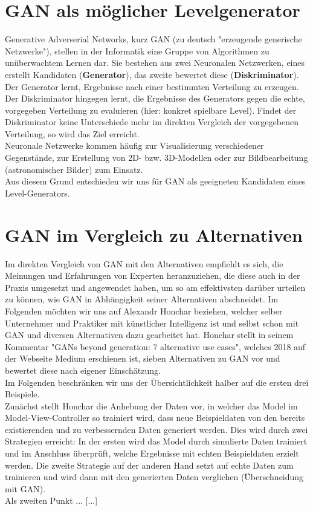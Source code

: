 \documentclass[11pt]{article}
\begin{document}
\section{GAN als möglicher Levelgenerator}
Generative Adverserial Networks, kurz GAN (zu deutsch "erzeugende generische Netzwerke"), stellen in der Informatik eine Gruppe von Algorithmen zu unüberwachtem Lernen dar. Sie bestehen aus zwei Neuronalen Netzwerken, eines erstellt Kandidaten (\textbf{Generator}), das zweite bewertet diese (\textbf{Diskriminator}).\\Der Generator lernt, Ergebnisse nach einer bestimmten Verteilung zu erzeugen. Der Diskriminator hingegen lernt, die Ergebnisse des Generators gegen die echte, vorgegeben Verteilung zu evaluieren (hier: konkret spielbare Level). Findet der Diskriminator keine Unterschiede mehr im direkten Vergleich der vorgegebenen Verteilung, so wird das Ziel erreicht.\\Neuronale Netzwerke kommen häufig zur Visualisierung verschiedener Gegenstände, zur Erstellung von 2D- bzw. 3D-Modellen oder zur Bildbearbeitung (astronomischer Bilder) zum Einsatz.\\Aus diesem Grund entschieden wir uns für GAN als geeigneten Kandidaten eines Level-Generators.
\section{GAN im Vergleich zu Alternativen}
Im direkten Vergleich von GAN mit den Alternativen empfiehlt es sich, die Meinungen und Erfahrungen von Experten heranzuziehen, die diese auch in der Praxis umgesetzt und angewendet haben, um so am effektivsten darüber urteilen zu können, wie GAN in Abhängigkeit seiner Alternativen abschneidet. Im Folgenden möchten wir uns auf Alexandr Honchar beziehen, welcher selber Unternehmer und Praktiker mit künstlicher Intelligenz ist und selbst schon mit GAN und diversen Alternativen dazu gearbeitet hat. Honchar stellt in seinem Kommentar "GANs beyond generation: 7 alternative use cases", welches 2018 auf der Webseite Medium erschienen ist, sieben Alternativen zu GAN vor und bewertet diese nach eigener Einschätzung.\\ Im Folgenden beschränken wir uns der Übersichtlichkeit halber auf die ersten drei Beispiele. \\Zunächst stellt Honchar die Anhebung der Daten vor, in welcher das Model im Model-View-Controller so trainiert wird, dass neue Beispieldaten von den bereits existierenden und zu verbessernden Daten generiert werden. Dies wird durch zwei Strategien erreicht: In der ersten wird das Model durch simulierte Daten trainiert und im Anschluss überprüft, welche Ergebnisse mit echten Beispieldaten erzielt werden. Die zweite Strategie auf der anderen Hand setzt auf echte Daten zum trainieren und wird dann mit den generierten Daten verglichen (Überschneidung mit GAN). \\ Als zweiten Punkt ... [...]
\end{document}

